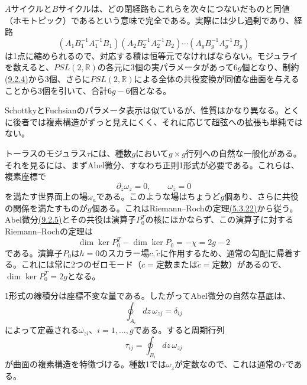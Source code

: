 $A$サイクルと$B$サイクルは、どの閉経路もこれらを次々につないだものと同値（ホモトピック）であるという意味で完全である。実際には少し過剰であり、経路
\begin{equation}
 (A_1B_1^{-1}A_1^{-1}B_1)(A_2B_2^{-1}A_2^{-1}B_2)
 \cdots(A_gB_g^{-1}A_g^{-1}B_g)
 \tag{9.2.4}\label{eq:9.2.4}
\end{equation}
は1点に縮められるので、対応する積は恒等元でなければならない。モジュライを数えると、$PSL(2,\mathbb R)$の各元に3個の実パラメータがあって$6g$個となり、制約\hyperref[eq:9.2.4]{(9.2.4)}から3個、さらに$PSL(2,\mathbb R)$による全体の共役変換が同値な曲面を与えることから3個を引いて、合計$6g-6$個となる。

SchottkyとFuchsianのパラメータ表示は似ているが、性質はかなり異なる。とくに後者では複素構造がずっと見えにくく、それに応じて超弦への拡張も単純ではない。

トーラスのモジュラス$\tau$には、種数$g$において$g\times g$行列への自然な一般化がある。それを見るには、まずAbel微分、すなわち正則1形式が必要である。これらは、複素座標で
\begin{equation}
 \partial_{\bar z}\omega_z=0,\qquad\omega_{\bar z}=0
 \tag{9.2.5}\label{eq:9.2.5}
\end{equation}
を満たす世界面上の場$\omega_a$である。このような場はちょうど$g$個あり、さらに共役の関係を満たすものが$g$個ある。これはRiemann--Rochの定理\hyperref[eq:5.3.22]{(5.3.22)}から従う。Abel微分\hyperref[eq:9.2.5]{(9.2.5)}とその共役は演算子$P_0^T$の核にほかならず、この演算子に対するRiemann--Rochの定理は
\begin{equation}
 \dim\ker P_0^T-\dim\ker P_0=-\chi=2g-2
 \tag{9.2.6}\label{eq:9.2.6}
\end{equation}
である。演算子$P_0$は$h=0$のスカラー場$c,\tilde c$に作用するため、通常の勾配に帰着する。これには常に2つのゼロモード（$c=\text{定数}$または$\tilde c=\text{定数}$）があるので、$\dim\ker P_0^T=2g$となる。

1形式の線積分は座標不変な量である。したがってAbel微分の自然な基底は、
\begin{equation}
 \oint_{A_i}dz\,\omega_{zj}=\delta_{ij}
 \tag{9.2.7}\label{eq:9.2.7}
\end{equation}
によって定義される$\omega_{zi}$、$i=1,\ldots,g$である。すると周期行列
\begin{equation}
 \tau_{ij}=\oint_{B_i}dz\,\omega_{zj}
 \tag{9.2.8}\label{eq:9.2.8}
\end{equation}
が曲面の複素構造を特徴づける。種数1では$\omega_z$が定数なので、これは通常の$\tau$である。

